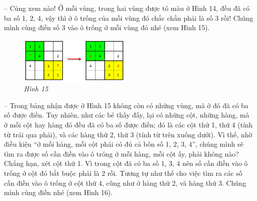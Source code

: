 		-- Cùng xem nào! Ở mỗi vùng, trong hai vùng được tô màu ở Hình 14, đều đã có ba số 1, 2, 4, vậy thì ở ô trống của mỗi vùng đó chắc chắn phải là số 3 rồi! Chúng mình cùng điền số 3 vào ô trống ở mỗi vùng đó nhé (xem Hình 15).
		\vskip 0.1cm
		\begin{figure}
			\centering
			\captionsetup{labelformat= empty, justification=centering}
			\includegraphics[width=0.48\textwidth]{pic4}
			\caption{\small\textit{Hình 15}}
			\vspace*{-10pt}
		\end{figure}
	-- Trong bảng nhận được ở Hình 15 không còn có những vùng, mà ở đó đã có ba số được điền. Tuy nhiên, như các bé thấy đấy, lại có những cột, những hàng, mà ở mỗi cột hay hàng đó đều đã có ba số được điền; đó là các cột thứ 1, thứ 4 (tính từ trái qua phải), và các hàng thứ 2, thứ 3 (tính từ trên xuống dưới). Vì thế, nhờ điều kiện “ở mỗi hàng, mỗi cột phái có đủ cả bốn số 1, 2, 3, 4”, chúng mình sẽ tìm ra được số cần điền vào ô tróng ở mỗi hàng, mỗi cột ấy, phải không nào? Chẳng hạn, xét cột thứ 1. Vì trong cột đã có ba số 1, 3, 4 nên số cần điền vào ô trống ở cột đó bắt buộc phải là 2 rồi. Tương tự như thế cho việc tìm ra các số cần điền vào ô trống ở cột thứ 4, cũng như ở hàng thứ 2, và hàng thứ 3. Chúng mình cùng điền nhé (xem Hình 16).
